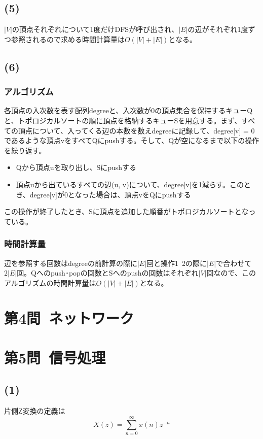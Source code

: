 \documentclass[a4paper,12pt,xelatex,ja=standard]{bxjsarticle}
\begin{document}
\subsection*{(5)}
$|V|$の頂点それぞれについて1度だけDFSが呼び出され、$|E|$の辺がそれぞれ1度ずつ参照されるので求める時間計算量は$O(|V| + |E|)$となる。

\subsection*{(6)}
\subsubsection*{アルゴリズム}
各頂点の入次数を表す配列degreeと、入次数が0の頂点集合を保持するキューQと、トポロジカルソートの順に頂点を格納するキューSを用意する。まず、すべての頂点について、入ってくる辺の本数を数えdegreeに記録して、degree[v] = 0であるような頂点vをすべてQにpushする。そして、Qが空になるまで以下の操作を繰り返す。
\begin{itemize}
  \item Qから頂点uを取り出し、Sにpushする
  \item 頂点uから出ているすべての辺(u, v)について、degree[v]を1減らす。このとき、degree[v]が0となった場合は、頂点vをQにpushする
\end{itemize}
この操作が終了したとき、Sに頂点を追加した順番がトポロジカルソートとなっている。

\subsubsection*{時間計算量}
辺を参照する回数はdegreeの前計算の際に$|E|$回と操作1~2の際に$|E|$で合わせて$2|E|$回。Qへのpush･popの回数とSへのpushの回数はそれぞれ$|V|$回なので、このアルゴリズムの時間計算量は$O(|V| + |E|)$となる。

\section*{第4問\ ネットワーク}

\section*{第5問\ 信号処理}
\subsection*{(1)}
片側Z変換の定義は
\[
  X(z) = \sum^{\infty}_{n=0}x(n)z^{-n}
\]
\end{document}

